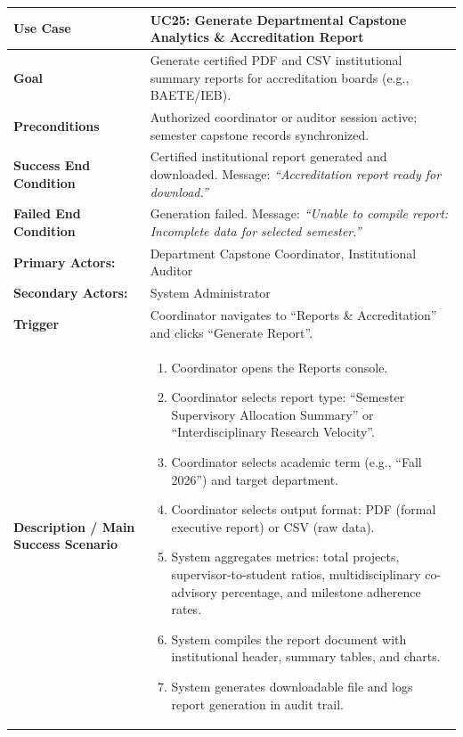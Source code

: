 \begin{table}[H]
\centering
\small
\begin{tabularx}{\textwidth}{|l|X|}
\hline
\rowcolor{lightgray!40} \textbf{Use Case} & \textbf{UC25: Generate Departmental Capstone Analytics \& Accreditation Report} \\ \hline
\textbf{Goal} & Generate certified PDF and CSV institutional summary reports for accreditation boards (e.g., BAETE/IEB). \\ \hline
\textbf{Preconditions} & Authorized coordinator or auditor session active; semester capstone records synchronized. \\ \hline
\textbf{Success End Condition} & Certified institutional report generated and downloaded. Message: \textit{``Accreditation report ready for download.''} \\ \hline
\textbf{Failed End Condition} & Generation failed. Message: \textit{``Unable to compile report: Incomplete data for selected semester.''} \\ \hline
\textbf{Primary Actors:} & Department Capstone Coordinator, Institutional Auditor \\
\textbf{Secondary Actors:} & System Administrator \\ \hline
\textbf{Trigger} & Coordinator navigates to ``Reports \& Accreditation'' and clicks ``Generate Report''. \\ \hline
\textbf{Description / Main Success Scenario} &
\begin{enumerate}[leftmargin=*]
    \item Coordinator opens the Reports console.
    \item Coordinator selects report type: ``Semester Supervisory Allocation Summary'' or ``Interdisciplinary Research Velocity''.
    \item Coordinator selects academic term (e.g., ``Fall 2026'') and target department.
    \item Coordinator selects output format: PDF (formal executive report) or CSV (raw data).
    \item System aggregates metrics: total projects, supervisor-to-student ratios, multidisciplinary co-advisory percentage, and milestone adherence rates.
    \item System compiles the report document with institutional header, summary tables, and charts.
    \item System generates downloadable file and logs report generation in audit trail.
\end{enumerate} \\ \hline

\end{tabularx}
\end{table}
